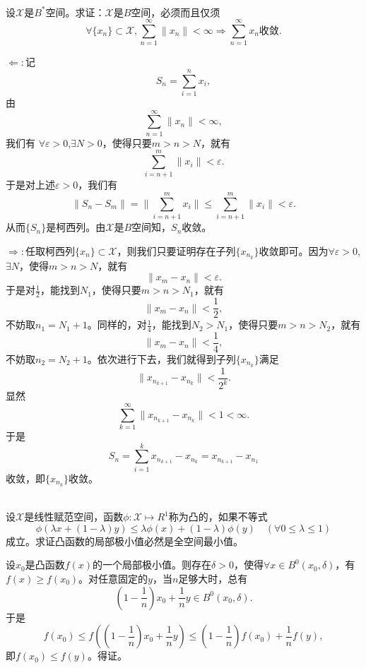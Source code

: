 \begin{exercise}
\hfill\\
设$\mathscr{X}$是$B^*$空间。求证：$\mathscr{X}$是$B$空间，必须而且仅须
$$\forall \{x_n\}\subset\mathscr{X},\sum_{n=1}^{\infty}\|x_n\|<\infty\Longrightarrow\sum_{n=1}^{\infty}x_n\text{收敛}.$$

$\Leftarrow:$记$$S_n=\sum_{i=1}^{n}x_i,$$
由$$\sum_{n=1}^{\infty}\|x_n\|<\infty,$$我们有
$\forall\varepsilon>0$,$\exists N>0$，使得只要$m>n>N$，就有
$$\sum_{i=n+1}^{m}\|x_i\|<\varepsilon.$$于是对上述$\varepsilon>0$，我们有
$$\|S_n-S_m\|=\|\sum_{i=n+1}^{m}x_i\|\leq\sum_{i=n+1}^{m}\|x_i\|<\varepsilon.$$从而$\{S_n\}$是柯西列。由$\mathscr{X}$是$B$空间知，$S_n$收敛。

$\Rightarrow:$任取柯西列$\{x_n\}\subset\mathscr{X}$，则我们只要证明存在子列$\{x_{n_k}\}$收敛即可。因为$\forall\varepsilon>0$,$\exists N$，使得$m>n>N$，就有$$\|x_m-x_n\|<\varepsilon.$$于是对$\frac{1}{2}$，能找到$N_1$，使得只要$m>n>N_1$，就有$$\|x_m-x_n\|<\frac12,$$不妨取$n_1=N_1+1$。同样的，对$\frac{1}{4}$，能找到$N_2>N_1$，使得只要$m>n>N_2$，就有$$\|x_m-x_n\|<\frac{1}{4},$$不妨取$n_2=N_2+1$。依次进行下去，我们就得到子列$\{x_{n_k}\}$满足
$$\|x_{n_{k+1}}-x_{n_k}\|<\frac{1}{2^k}.$$
显然$$\sum_{k=1}^{\infty}\|x_{n_{k+1}}-x_{n_k}\|<1<\infty.$$于是$$S_n=\sum_{i=1}^{k}x_{n_{k+1}}-x_{n_k}=x_{n_{k+1}}-x_{n_1}$$收敛，即$\{x_{n_k}\}$收敛。
\end{exercise}

\begin{exercise}
\hfill\\
设$\mathscr{X}$是线性赋范空间，函数$\phi:\mathscr{X}\mapsto R^1$称为凸的，如果不等式
\begin{equation}\label{tu}
\phi(\lambda x+(1-\lambda)y)\leq\lambda\phi(x)+(1-\lambda)\phi(y)\quad(\forall 0\leq\lambda\leq1)
\end{equation}
成立。求证凸函数的局部极小值必然是全空间最小值。

设$x_0$是凸函数$f(x)$的一个局部极小值。则存在$\delta>0$，使得$\forall x\in B^0(x_0,\delta)$，有$f(x)\geq f(x_0)$。对任意固定的$y$，当$n$足够大时，总有
$$(1-\frac{1}{n})x_0+\frac{1}{n}y\in B^0(x_0,\delta).$$
于是$$f(x_0)\leq f((1-\frac{1}{n})x_0+\frac{1}{n}y)\leq (1-\frac1n)f(x_0)+\frac{1}{n}f(y),$$
即$f(x_0)\leq f(y)$。得证。
\end{exercise}

